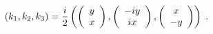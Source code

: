 \begin{equation}
 (k_1,k_2,k_3) 
 = {i \over 2} \left(  
  \left(\begin{array}{c}
          y \\
          x
	\end{array}\right), 
  \left(\begin{array}{c}
          -iy \\
           ix
	\end{array}\right), 
  \left(\begin{array}{c}
           x \\
          -y
	\end{array}\right)
 \right) \;. 
\end{equation}

